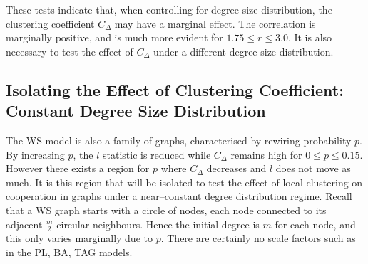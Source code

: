 \FloatBarrier
{}
\FloatBarrier
{} \FloatBarrier

These tests indicate that, when controlling for degree size distribution, the clustering coefficient $C_\Delta$ may have a marginal effect. The correlation is marginally positive, and is much more evident for $1.75\leq r\leq 3.0$. It is also necessary to test the effect of $C_\Delta$ under a different degree size distribution. \\

\subsection{Isolating the Effect of Clustering Coefficient: Constant Degree Size Distribution}
The WS model is also a family of graphs, characterised by rewiring probability $p$. By increasing $p$, the $l$ statistic is reduced while $C_\Delta$ remains high for $0\leq p\leq0.15$. However there exists a region for $p$ where $C_\Delta$ decreases and $l$ does not move as much. It is this region that will be isolated to test the effect of local clustering on cooperation in graphs under a near--constant degree distribution regime. Recall that a WS graph starts with a circle of nodes, each node connected to its adjacent $\frac{m}{2}$ circular neighbours. Hence the initial degree is $m$ for each node, and this only varies marginally due to $p$. There are certainly no scale factors such as in the PL, BA, TAG models. \\

